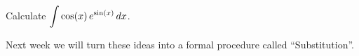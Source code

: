 \newpage
\begin{problem}
	Calculate $\displaystyle \int\cos (x)\,e^{\sin (x)}\,dx$.
	
\end{problem}
\vfill

Next week we will turn these ideas into a formal procedure called ``Substitution''.




